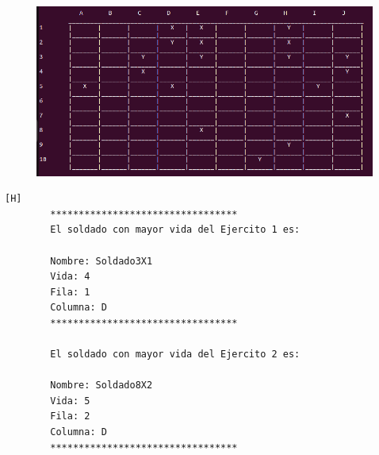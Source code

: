 \documentclass{article}
\begin{document}
	\begin{figure}[H]
		\centering
		\includegraphics[width=1.0\textwidth,keepaspectratio]{img/Commit6.png}
	\end{figure}
	\begin{lstlisting}[language=bash,caption={Ejecucion:}][H]
		*********************************
		El soldado con mayor vida del Ejercito 1 es: 
		
		Nombre: Soldado3X1
		Vida: 4
		Fila: 1
		Columna: D
		*********************************
		
		El soldado con mayor vida del Ejercito 2 es: 
		
		Nombre: Soldado8X2
		Vida: 5
		Fila: 2
		Columna: D
		*********************************
		
	\end{lstlisting}
\end{document}
